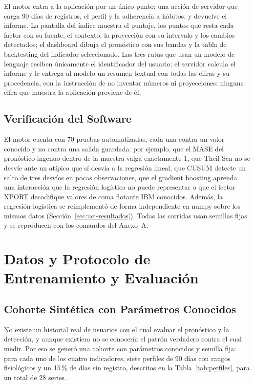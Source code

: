 \documentclass[12pt,letterpaper]{article}
\begin{document}
El motor entra a la aplicación por un único punto: una acción de servidor que
carga 90 días de registros, el perfil y la adherencia a hábitos, y devuelve el
informe. La pantalla del índice muestra el puntaje, los puntos que resta cada
factor con su fuente, el contexto, la proyección con su intervalo y los cambios
detectados; el dashboard dibuja el pronóstico con sus bandas y la tabla de
backtesting del indicador seleccionado. Las tres rutas que usan un modelo de
lenguaje reciben únicamente el identificador del usuario; el servidor calcula el
informe y le entrega al modelo un resumen textual con todas las cifras y su
procedencia, con la instrucción de no inventar números ni proyecciones: ninguna
cifra que muestra la aplicación proviene de él.

\subsection{Verificación del Software}

El motor cuenta con 70 pruebas automatizadas, cada una contra un valor conocido y
no contra una salida guardada: por ejemplo, que el MASE del pronóstico ingenuo
dentro de la muestra valga exactamente 1, que Theil-Sen no se desvíe ante un
atípico que sí desvía a la regresión lineal, que CUSUM detecte un salto de tres
desvíos en pocas observaciones, que el gradient boosting aprenda una
interacción que la regresión logística no puede representar o que el lector
XPORT decodifique valores de coma flotante IBM conocidos. Además, la regresión
logística se reimplementó de forma independiente en numpy sobre los mismos datos
(Sección~\ref{sec:uci-resultados}). Todas las corridas usan semillas fijas y se
reproducen con los comandos del Anexo~A.

\newpage

\section{Datos y Protocolo de Entrenamiento y Evaluación}
\label{sec:protocolo}

\subsection{Cohorte Sintética con Parámetros Conocidos}

No existe un historial real de usuarios con el cual evaluar el pronóstico y la
detección, y aunque existiera no se conocería el patrón verdadero contra el cual
medir. Por eso se generó una cohorte con parámetros conocidos y semilla fija:
para cada uno de los cuatro indicadores, siete perfiles de 90 días con rangos
fisiológicos y un 15\,\% de días sin registro, descritos en la
Tabla~\ref{tab:perfiles}, para un total de 28 series.
\end{document}
